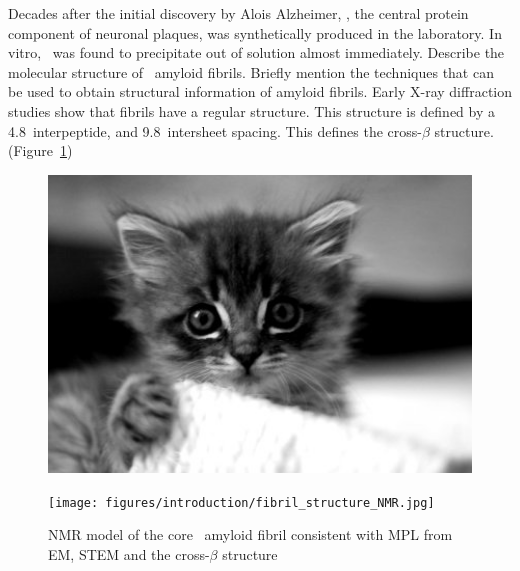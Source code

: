    \begin{outline}
    \1 Decades after the initial discovery by Alois Alzheimer, \abeta, the central protein component of neuronal plaques, was synthetically produced in the laboratory. In vitro, \abeta\ was found to precipitate out of solution almost immediately. 
  		\2 Describe the molecular structure of \abeta\ amyloid fibrils. Briefly mention the techniques that can be used to obtain structural information of amyloid fibrils. Early X-ray diffraction studies show that fibrils have a regular structure.  This structure is defined by a 4.8\angstrom\ interpeptide, and 9.8\angstrom\ intersheet spacing. This defines the cross-$\beta$ structure. (Figure~\ref{fig:fibril_diffraction})
  	\end{outline}

    \begin{figure}
      \centering
      \includegraphics[width=6in]{figures/introduction/fibril_structure_diffraction.jpg}
      \caption[Characteristic cross-$\beta$ spacings from X-ray fibre diffraction studies of amyloid fibrils]{}
      \label{fig:fibril_diffraction}
    \end{figure}

    \begin{figure}
      \centering
      \texttt{[image: figures/introduction/fibril\_structure\_NMR.jpg]}
      \caption[Blah]{NMR model of the core \abeta\ amyloid fibril consistent with MPL from EM, STEM and the cross-$\beta$ structure}
      \label{fig:NMR_fibril_model}
    \end{figure}
  
